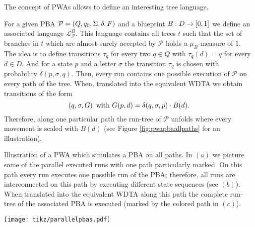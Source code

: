 The concept of \acp{PWA} allows to define an interesting tree language.
\begin{example}
  \cite[Proposition 43]{RandAutoInfTrees}
  For a given \ac{PBA} $\mathcal{P} = \left(Q, q_{0}, \Sigma, \delta, F\right)$ and
  a blueprint $B:D\rightarrow\left[0,1\right]$ we define an associated language 
  $\mathcal{L}_{\mathcal{P}}^{B}$. This language contains all trees $t$ such 
  that the set of branches in $t$ which are almost-surely accepted by 
  $\mathcal{P}$ holds a $\mu_{B}$-measure of $1$. The idea is to define 
  transitions $\tau_{q}$ for every two $q\in Q$ with $\tau_{q}(d) = q$ for 
  every $d\in D$. And for a state $p$ and a letter $\sigma$ the transition 
  $\tau_{q}$ is chosen with probability $\delta(p, \sigma, q)$. Then, every run
  contains one possible execution of $\mathcal{P}$ on every path of the tree.
  When, translated into the equivalent \ac{WDTA} we obtain transitions of the
  form
  \begin{equation*}
    \left(q, \sigma, G\right)\text{ with }G(p,d) = \delta(q,\sigma, p)\cdot B(d).
  \end{equation*}
  Therefore, along one particular path the run-tree of $\mathcal{P}$ unfolds
  where every movement is scaled with $B(d)$ (see Figure 
  \ref{fig:pwapbaallpaths} for an illustration).
  \label{ex:pwapbaallpaths}
\end{example}
\begin{drawing}
  \caption{Illustration of a \ac{PWA} which simulates a \ac{PBA} on all paths. 
  In $(a)$ we picture some of the parallel executed runs with one path 
  particularly marked. On this path every run executes one possible run of the
  \ac{PBA}; therefore, all runs are interconnected on this path by executing 
  different state sequences (see $(b)$). When translated into the equivalent
  \ac{WDTA} along this path the complete run-tree of the associated
  \ac{PBA} is executed (marked by the colored path in $(c)$).}
  \label{fig:pwapbaallpaths}
  \begin{center}
    \texttt{[image: tikz/parallelpbas.pdf]}
  \end{center}
\end{drawing}


